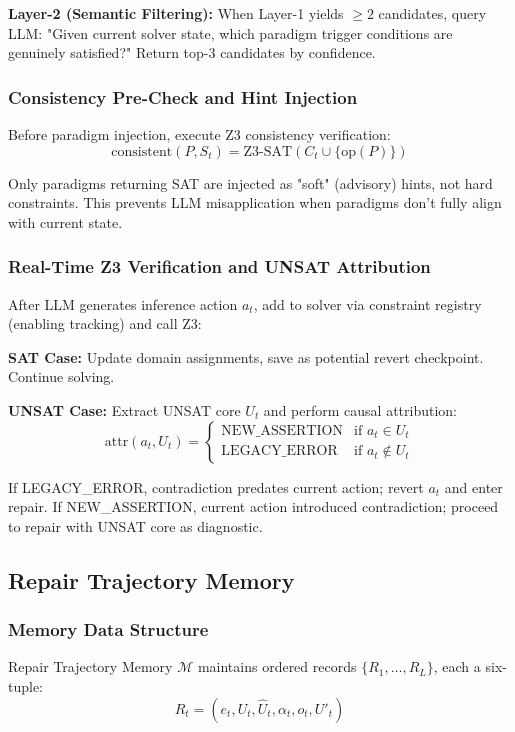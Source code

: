 \documentclass[letterpaper]{article}
\begin{document}
\textbf{Layer-2 (Semantic Filtering):} When Layer-1 yields $\geq 2$ candidates, query LLM: "Given current solver state, which paradigm trigger conditions are genuinely satisfied?" Return top-3 candidates by confidence.

\subsubsection{Consistency Pre-Check and Hint Injection}

Before paradigm injection, execute Z3 consistency verification:
$$\text{consistent}(P, S_t) = \text{Z3-SAT}(C_t \cup \{\text{op}(P)\})$$

Only paradigms returning SAT are injected as "soft" (advisory) hints, not hard constraints. This prevents LLM misapplication when paradigms don't fully align with current state.

\subsubsection{Real-Time Z3 Verification and UNSAT Attribution}

After LLM generates inference action $a_t$, add to solver via constraint registry (enabling tracking) and call Z3:

\textbf{SAT Case:} Update domain assignments, save as potential revert checkpoint. Continue solving.

\textbf{UNSAT Case:} Extract UNSAT core $U_t$ and perform causal attribution:
$$\text{attr}(a_t, U_t) = \begin{cases} \text{NEW\_ASSERTION} & \text{if } a_t \in U_t \\ \text{LEGACY\_ERROR} & \text{if } a_t \notin U_t \end{cases}$$

If LEGACY\_ERROR, contradiction predates current action; revert $a_t$ and enter repair. If NEW\_ASSERTION, current action introduced contradiction; proceed to repair with UNSAT core as diagnostic.

\subsection{Repair Trajectory Memory}

\subsubsection{Memory Data Structure}

Repair Trajectory Memory $\mathcal{M}$ maintains ordered records $\{R_1, \ldots, R_L\}$, each a six-tuple:
$$R_t = (e_t, U_t, \hat{U}_t, \alpha_t, o_t, U'_t)$$
\end{document}
